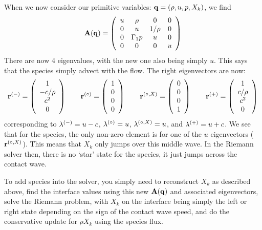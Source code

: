When we now consider our primitive variables: ${\bf q} = (\rho, u, p, X_k)$,
we find
\begin{equation}
{\bf A}({\bf q}) = \left ( \begin{array}{cccc} u  & \rho     & 0      &  0\\
                                  0  &  u       & 1/\rho &  0\\
                                  0  & \Gamma_1 p & u      &  0\\
                                  0  & 0        & 0      & u \end{array} \right )
\end{equation}
There are now 4 eigenvalues, with the new one also being simply $u$.
This says that the species simply advect with the flow.  The right
eigenvectors are now:
\begin{equation}
\rb^\evm = \left ( \begin{array}{c} 1 \\ -c/\rho \\ c^2 \\ 0\end{array} \right )
%
\qquad
\rb^\evz = \left ( \begin{array}{c} 1 \\ 0 \\ 0  \\ 0\end{array} \right )
%
\qquad
\rb^\evzs{X} = \left ( \begin{array}{c} 0 \\ 0  \\ 0 \\ 1 \end{array} \right )
%
\qquad
\rb^\evp = \left ( \begin{array}{c} 1 \\ c/\rho \\ c^2 \\ 0 \end{array} \right )
\end{equation}
corresponding to $\lambda^{(-)} = u -c$, $\lambda^{(\circ)} = u$,
$\lambda^{(\circ,X)} = u$, and $\lambda^{(+)} = u + c$.  We see that for
the species, the only non-zero element is for one of the $u$
eigenvectors (${\bf r}^{(\circ,X)}$).  This means that $X_k$ only jumps over
this middle wave.  In the Riemann solver then, there is no `star'
state for the species, it just jumps across the contact wave.

To add species into the solver, you simply need to reconstruct $X_k$
as described above, find the interface values using this new ${\bf A}({\bf q})$
and associated eigenvectors, solve the Riemann problem, with $X_k$ on
the interface being simply the left or right state depending on the
sign of the contact wave speed, and do the conservative update for
$\rho X_k$ using the species flux.


